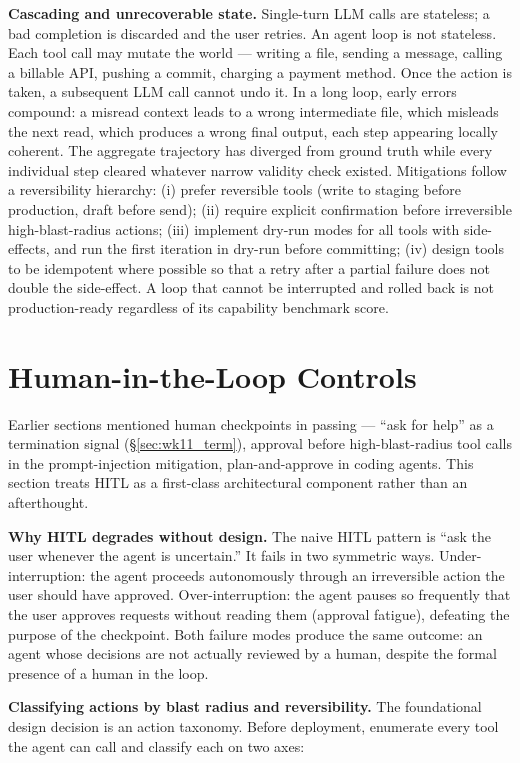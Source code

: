 \textbf{Cascading and unrecoverable state.} Single-turn LLM
calls are stateless; a bad completion is discarded and the user
retries. An agent loop is not stateless. Each tool call may
mutate the world --- writing a file, sending a message, calling
a billable API, pushing a commit, charging a payment method.
Once the action is taken, a subsequent LLM call cannot undo it.
In a long loop, early errors compound: a misread context leads
to a wrong intermediate file, which misleads the next read,
which produces a wrong final output, each step appearing locally
coherent. The aggregate trajectory has diverged from ground
truth while every individual step cleared whatever narrow
validity check existed. Mitigations follow a reversibility
hierarchy: (i) prefer reversible tools (write to staging before
production, draft before send); (ii) require explicit
confirmation before irreversible high-blast-radius actions; (iii)
implement dry-run modes for all tools with side-effects, and run
the first iteration in dry-run before committing; (iv) design
tools to be idempotent where possible so that a retry after a
partial failure does not double the side-effect. A loop that
cannot be interrupted and rolled back is not production-ready
regardless of its capability benchmark score.

\section{Human-in-the-Loop Controls}
\label{sec:wk11_hitl}

Earlier sections mentioned human checkpoints in passing ---
``ask for help'' as a termination signal
(\S\ref{sec:wk11_term}), approval before high-blast-radius
tool calls in the prompt-injection mitigation, plan-and-approve
in coding agents. This section treats HITL as a first-class
architectural component rather than an afterthought.

\textbf{Why HITL degrades without design.} The naive HITL
pattern is ``ask the user whenever the agent is uncertain.'' It
fails in two symmetric ways. Under-interruption: the agent
proceeds autonomously through an irreversible action the user
should have approved. Over-interruption: the agent pauses so
frequently that the user approves requests without reading them
(approval fatigue), defeating the purpose of the checkpoint.
Both failure modes produce the same outcome: an agent whose
decisions are not actually reviewed by a human, despite the
formal presence of a human in the loop.

\textbf{Classifying actions by blast radius and reversibility.}
The foundational design decision is an action taxonomy. Before
deployment, enumerate every tool the agent can call and classify
each on two axes:

